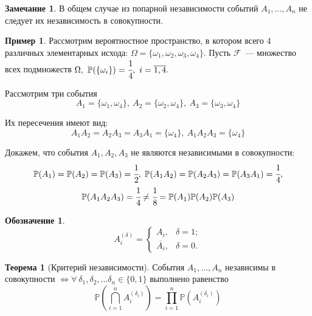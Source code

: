 \documentclass[oneside,final,14pt]{extreport}
\newcommand\myprob[1]{{\mathbb{P}(#1)}}
\theoremstyle{plain}
\theoremstyle{definition}
\newtheorem*{exmp}{Пример}
\newtheorem*{symb}{Обозначение}
\newtheorem*{rmrk}{Замечание}
\theoremstyle{named}
\newtheorem*{namedthm}{Теорема}
\begin{document}
\begin{rmrk}
    В общем случае из попарной независимости событий $A_1, \ldots, A_n$ не следует их независимость в совокупности.
    \begin{exmp}
        Рассмотрим вероятностное пространство, в котором всего 4 различных элементарных исхода: $\Omega = \{\omega_1, \omega_2, \omega_3, \omega_4 \}$. Пусть $\mathcal{F}$~--- множество всех подмножеств $\Omega,~\myprob{\{\omega_i\}} = \cfrac{1}{4},~i = \overline{1,4}$.
        
        Рассмотрим три события 
        \begin{equation*}
            A_1 = \{\omega_1, \omega_4 \},~ 
            A_2 = \{\omega_2, \omega_4 \},~
            A_3 = \{\omega_3, \omega_4 \}
        \end{equation*}
        
        Их пересечения имеют вид:
        \begin{equation*}
            A_1A_2 = A_2A_3 = A_3A_1 = \{\omega_4 \},~
            A_1A_2A_3 = \{\omega_4 \}
        \end{equation*}
        
        Докажем, что события $A_1, A_2, A_3$ не являются независимыми в совокупности:
        \begin{gather*}
            \myprob{A_1} = \myprob{A_2} = \myprob{A_3} = \cfrac{1}{2}, \; \myprob{A_1A_2} = \myprob{A_2A_3} = \myprob{A_3A_1} = \cfrac{1}{4}, \\ \myprob{A_1A_2A_3} = \cfrac{1}{4} \neq \cfrac{1}{8} = \myprob{A_1}\myprob{A_2}\myprob{A_3}
        \end{gather*}
    \end{exmp}
\end{rmrk}

\begin{symb}
    \begin{equation*}
        A_{i}^{(\delta)} =
        \begin{cases}
            A_{i}, & \delta = 1; \\
            \overline{A_{i}}, & \delta = 0.
        \end{cases}
    \end{equation*}
\end{symb}

\begin{namedthm}[Критерий независимости]
    События $A_1, \ldots, A_n$ независимы в совокупности $\Leftrightarrow \forall ~ \delta_1, \delta_2, \ldots \delta_n \in \{0, 1\}$ выполнено равенство
    \begin{equation*}
        \mathbb{P}\left( \bigcap_{i=1}^{n} A_{i}^{\left( \delta_{i} \right)} \right)
        = \prod_{i=1}^{n}\mathbb{P}\left( A_{i}^{\left(\delta_{i}\right)} \right)
    \end{equation*}
\end{namedthm}
\end{document}
